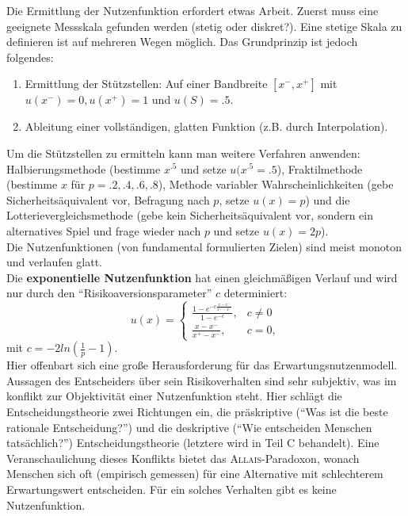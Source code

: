 Die Ermittlung der Nutzenfunktion erfordert etwas Arbeit. Zuerst muss eine geeignete Messskala gefunden werden (stetig oder diskret?). Eine stetige Skala zu definieren ist auf mehreren Wegen möglich. Das Grundprinzip ist jedoch folgendes:
\begin{enumerate}
	\item Ermittlung der Stützstellen:
	Auf einer Bandbreite \([x^-, x^+]\) mit \(u(x^-) = 0, u(x^+) = 1\) und \(u(S) = .5\).
	\item Ableitung einer vollständigen, glatten Funktion (z.B. durch Interpolation).
\end{enumerate}
Um die Stützstellen zu ermitteln kann man weitere Verfahren anwenden: Halbierungsmethode (bestimme \(x^{.5}\) und setze \(u(x^{.5} = .5\)), Fraktilmethode (bestimme \(x\) für \(p=.2,.4,.6,.8\)), Methode variabler Wahrscheinlichkeiten (gebe Sicherheitsäquivalent vor, Befragung nach \(p\), setze \(u(x) = p\)) und die Lotterievergleichsmethode (gebe kein Sicherheitsäquivalent vor, sondern ein alternatives Spiel und frage wieder nach \(p\) und setze \(u(x)=2p\)).\\
Die Nutzenfunktionen (von fundamental formulierten Zielen) sind meist monoton und verlaufen glatt.\\
Die \textbf{exponentielle Nutzenfunktion} hat einen gleichmäßigen Verlauf und wird nur durch den ``Risikoaversionsparameter'' \(c\) determiniert:
\[
	u(x) = \left\lbrace
		\begin{array}{ll}
			\frac{1-e^{-c\frac{x-x^-}{x^+-x^-}}}{1-e^{-c}}, & c \neq 0\\
			\frac{x-x^-}{x^+-x^-}, & c = 0,
		\end{array}
	\right.
\]
mit \(c = -2ln(\frac{1}{p}-1)\).\\
Hier offenbart sich eine große Herausforderung für das Erwartungsnutzenmodell. Aussagen des Entscheiders über sein Risikoverhalten sind sehr subjektiv, was im konflikt zur Objektivität einer Nutzenfunktion steht. Hier schlägt die Entscheidungstheorie zwei Richtungen ein, die präskriptive (``Was ist die beste rationale Entscheidung?'') und die deskriptive (``Wie entscheiden Menschen tatsächlich?'') Entscheidungstheorie (letztere wird in Teil C behandelt). Eine Veranschaulichung dieses Konflikts bietet das \textsc{Allais}-Paradoxon, wonach Menschen sich oft (empirisch gemessen) für eine Alternative mit schlechterem Erwartungswert entscheiden. Für ein solches Verhalten gibt es keine Nutzenfunktion.\\
